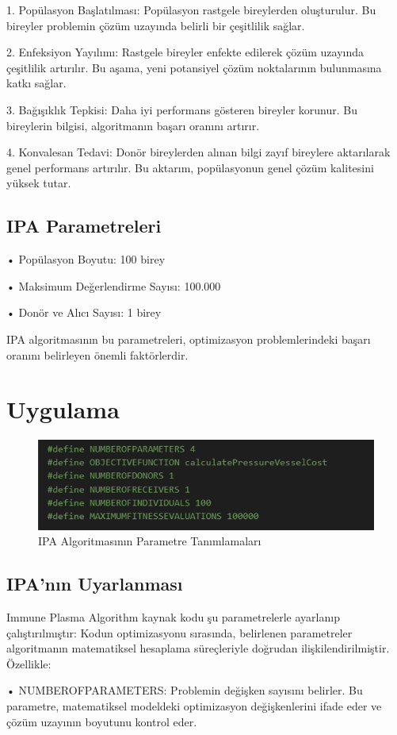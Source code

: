 \documentclass[12pt,a4paper]{article}
\begin{document}
1.	Popülasyon Başlatılması: Popülasyon rastgele bireylerden oluşturulur. Bu bireyler problemin çözüm uzayında belirli bir çeşitlilik sağlar.

2.	Enfeksiyon Yayılımı: Rastgele bireyler enfekte edilerek çözüm uzayında çeşitlilik artırılır. Bu aşama, yeni potansiyel çözüm noktalarının bulunmasına katkı sağlar.

3.	Bağışıklık Tepkisi: Daha iyi performans gösteren bireyler korunur. Bu bireylerin bilgisi, algoritmanın başarı oranını artırır.

4.	Konvalesan Tedavi: Donör bireylerden alınan bilgi zayıf bireylere aktarılarak genel performans artırılır. Bu aktarım, popülasyonun genel çözüm kalitesini yüksek tutar.

\subsection{IPA Parametreleri}


    •	Popülasyon Boyutu: 100 birey

•	Maksimum Değerlendirme Sayısı: 100.000

•	Donör ve Alıcı Sayısı: 1 birey

IPA algoritmasının bu parametreleri, optimizasyon problemlerindeki başarı oranını belirleyen önemli faktörlerdir.


\section{Uygulama}
\begin{figure}[h!]
    \centering
    \includegraphics[width=0.5\linewidth]{1.png}
    \caption{IPA Algoritmasının Parametre Tanımlamaları}
    \label{fig:parameters}
\end{figure}

\subsection{IPA'nın Uyarlanması}
Immune Plasma Algorithm kaynak kodu şu parametrelerle ayarlanıp çalıştırılmıştır:
Kodun optimizasyonu sırasında, belirlenen parametreler algoritmanın matematiksel hesaplama süreçleriyle doğrudan ilişkilendirilmiştir. Özellikle:

•	NUMBEROFPARAMETERS: Problemin değişken sayısını belirler. Bu parametre, matematiksel modeldeki optimizasyon değişkenlerini ifade eder ve çözüm uzayının boyutunu kontrol eder.
\end{document}
